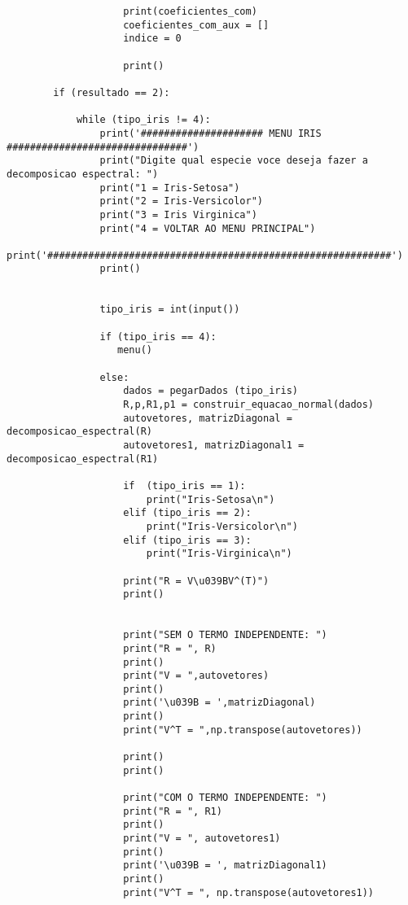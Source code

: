 \documentclass[a4paper,12pt,twoside]{article}
\begin{document}
\begin{lstlisting}
                    print(coeficientes_com)
                    coeficientes_com_aux = []  
                    indice = 0
                   
                    print()
    
        if (resultado == 2):
            
            while (tipo_iris != 4):
                print('##################### MENU IRIS ###############################')
                print("Digite qual especie voce deseja fazer a decomposicao espectral: ")
                print("1 = Iris-Setosa")
                print("2 = Iris-Versicolor")
                print("3 = Iris Virginica")
                print("4 = VOLTAR AO MENU PRINCIPAL")
                print('###########################################################')
                print()
             
             
                tipo_iris = int(input())
                
                if (tipo_iris == 4):
                   menu()
                   
                else:
                    dados = pegarDados (tipo_iris)
                    R,p,R1,p1 = construir_equacao_normal(dados)
                    autovetores, matrizDiagonal = decomposicao_espectral(R)
                    autovetores1, matrizDiagonal1 = decomposicao_espectral(R1)
                    
                    if  (tipo_iris == 1):
                        print("Iris-Setosa\n")
                    elif (tipo_iris == 2):
                        print("Iris-Versicolor\n")
                    elif (tipo_iris == 3):
                        print("Iris-Virginica\n")
                    
                    print("R = V\u039BV^(T)")
                    print()
                    
                    
                    print("SEM O TERMO INDEPENDENTE: ")
                    print("R = ", R)
                    print()
                    print("V = ",autovetores)
                    print()
                    print('\u039B = ',matrizDiagonal)
                    print()
                    print("V^T = ",np.transpose(autovetores))
                    
                    print()
                    print()
                    
                    print("COM O TERMO INDEPENDENTE: ")
                    print("R = ", R1)
                    print()
                    print("V = ", autovetores1)
                    print()
                    print('\u039B = ', matrizDiagonal1)
                    print()
                    print("V^T = ", np.transpose(autovetores1))
                    

\end{lstlisting}
\end{document}
